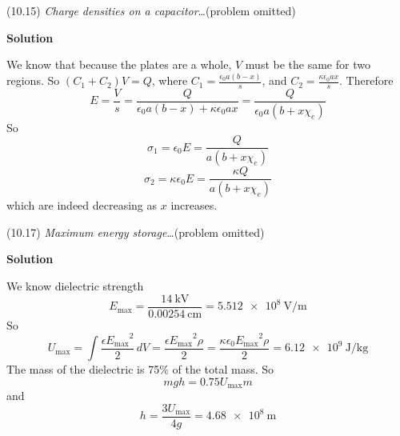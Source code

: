\documentclass{article}
\begin{document}

\begin{homeworkProblem}
	(10.15) \textit{Charge densities on a capacitor}\ldots (problem omitted)

	\textbf{Solution}

	We know that because the plates are a whole, $V$ must be the same for two regions. So $(C_1+C_2)V=Q$, where $C_1=\frac{\epsilon_0a(b-x)}{s}$, and $C_2=\frac{\kappa\epsilon_0ax}{s}$. Therefore
	\[
		E=\frac{V}{s}=\frac{Q}{\epsilon_0a(b-x)+\kappa\epsilon_0ax}=\frac{Q}{\epsilon_0a(b+x\chi_e)}
	\]
	So
	\[
		\sigma_1=\epsilon_0E=\frac{Q}{a(b+x\chi_e)}
	\]
	\[
		\sigma_2=\kappa\epsilon_0E=\frac{\kappa Q}{a(b+x\chi_e)}
	\]
	which are indeed decreasing as $x$ increases.
\end{homeworkProblem}


\begin{homeworkProblem}
	(10.17) \textit{Maximum energy storage}\ldots (problem omitted)

	\textbf{Solution}

	We know dielectric strength
	\[
		E_\mathrm{max}=\frac{\SI{14}{\kilo\volt}}{\SI{0.00254}{\cm}}=\SI{5.512e8}{\volt\per\meter}
	\]
	So
	\[
		U_\mathrm{max}=\int\frac{\epsilon{E_\mathrm{max}}^2}{2}\,dV=\frac{\epsilon{E_\mathrm{max}}^2\rho}{2}=\frac{\kappa\epsilon_0{E_\mathrm{max}}^2\rho}{2}=\SI{6.12e9}{\joule\per\kg}
	\]
	The mass of the dielectric is 75\% of the total mass. So
	\[
		mgh=0.75U_\mathrm{max}m
	\]
	and
	\[
		h=\frac{3U_\mathrm{max}}{4g}=\SI{4.68e8}{\meter}
	\]
\end{homeworkProblem}

\end{document}
